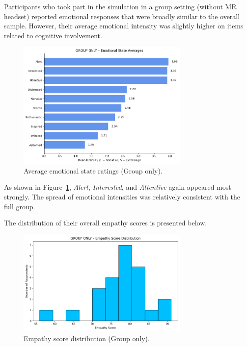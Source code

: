 Participants who took part in the simulation in a group setting (without MR headset) reported emotional responses that were broadly similar to the overall sample. However, their average emotional intensity was slightly higher on items related to cognitive involvement.

\begin{figure}[H]
    \centering
    \includegraphics[width=0.75\textwidth]{../../Figures/emotional-post-grp.png}
    \caption{Average emotional state ratings (Group only).}
    \label{fig:emotional_post_group}
\end{figure}

As shown in Figure~\ref{fig:emotional_post_group}, \textit{Alert}, \textit{Interested}, and \textit{Attentive} again appeared most strongly. The spread of emotional intensities was relatively consistent with the full group.

\vspace{1em}

The distribution of their overall empathy scores is presented below.

\begin{figure}[H]
    \centering
    \includegraphics[width=0.75\textwidth]{../../Figures/empathy-score-post-grp.png}
    \caption{Empathy score distribution (Group only).}
    \label{fig:empathy_group_post}
\end{figure}

